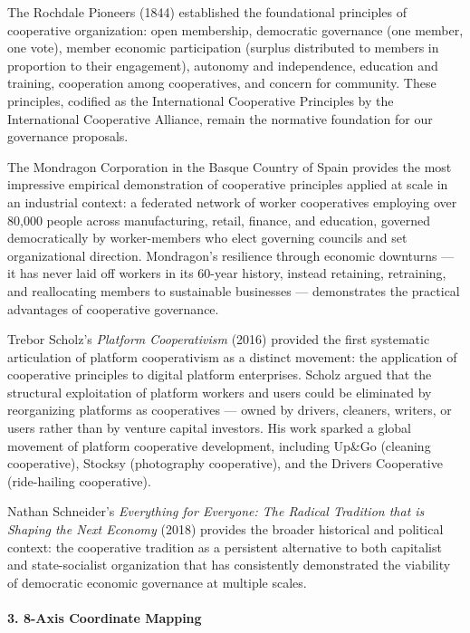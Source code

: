 The Rochdale Pioneers (1844) established the foundational principles of
cooperative organization: open membership, democratic governance (one
member, one vote), member economic participation (surplus distributed to
members in proportion to their engagement), autonomy and independence,
education and training, cooperation among cooperatives, and concern for
community. These principles, codified as the International Cooperative
Principles by the International Cooperative Alliance, remain the
normative foundation for our governance proposals.

The Mondragon Corporation in the Basque Country of Spain provides the
most impressive empirical demonstration of cooperative principles
applied at scale in an industrial context: a federated network of worker
cooperatives employing over 80,000 people across manufacturing, retail,
finance, and education, governed democratically by worker-members who
elect governing councils and set organizational direction. Mondragon's
resilience through economic downturns --- it has never laid off workers
in its 60-year history, instead retaining, retraining, and reallocating
members to sustainable businesses --- demonstrates the practical
advantages of cooperative governance.

Trebor Scholz's \emph{Platform Cooperativism} (2016) provided the first
systematic articulation of platform cooperativism as a distinct
movement: the application of cooperative principles to digital platform
enterprises. Scholz argued that the structural exploitation of platform
workers and users could be eliminated by reorganizing platforms as
cooperatives --- owned by drivers, cleaners, writers, or users rather
than by venture capital investors. His work sparked a global movement of
platform cooperative development, including Up\&Go (cleaning
cooperative), Stocksy (photography cooperative), and the Drivers
Cooperative (ride-hailing cooperative).

Nathan Schneider's \emph{Everything for Everyone: The Radical Tradition
that is Shaping the Next Economy} (2018) provides the broader historical
and political context: the cooperative tradition as a persistent
alternative to both capitalist and state-socialist organization that has
consistently demonstrated the viability of democratic economic
governance at multiple scales.

\paragraph{3. 8-Axis Coordinate
Mapping}\label{axis-coordinate-mapping-30}

